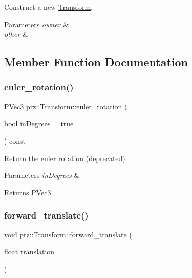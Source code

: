 Construct a new \mbox{\hyperlink{classprz_1_1_transform}{Transform}}. 


\begin{DoxyParams}{Parameters}
{\em owner} & \\
\hline
{\em other} & \\
\hline
\end{DoxyParams}


\subsection{Member Function Documentation}
\mbox{\label{classprz_1_1_transform_a1bd0c0c85eb27c3dda501de30b950010}} 
\subsubsection{\texorpdfstring{euler\_rotation()}{euler\_rotation()}}
{\footnotesize\ttfamily P\+Vec3 prz\+::\+Transform\+::euler\+\_\+rotation (\begin{DoxyParamCaption}\item[{bool}]{in\+Degrees = {\ttfamily true} }\end{DoxyParamCaption}) const}



Return the euler rotation (deprecated) 


\begin{DoxyParams}{Parameters}
{\em in\+Degrees} & \\
\hline
\end{DoxyParams}
\begin{DoxyReturn}{Returns}
P\+Vec3 
\end{DoxyReturn}
\mbox{\label{classprz_1_1_transform_a6f7a77db1c8c8d411a279932f7e826eb}} 
\subsubsection{\texorpdfstring{forward\_translate()}{forward\_translate()}}
{\footnotesize\ttfamily void prz\+::\+Transform\+::forward\+\_\+translate (\begin{DoxyParamCaption}\item[{float}]{translation }\end{DoxyParamCaption})}



